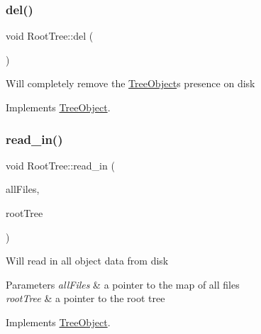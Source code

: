 \subsubsection{\texorpdfstring{del()}{del()}}
{\footnotesize\ttfamily void Root\+Tree\+::del (\begin{DoxyParamCaption}{ }\end{DoxyParamCaption})\hspace{0.3cm}{\ttfamily [virtual]}}

Will completely remove the \mbox{\hyperlink{classTreeObject}{Tree\+Object}}\textquotesingle{}s presence on disk 

Implements \mbox{\hyperlink{classTreeObject_af390b7479aa972888e594c07a85740b6}{Tree\+Object}}.

\mbox{\label{classRootTree_a658eed78be67e890de2283af960dc532}} 
\subsubsection{\texorpdfstring{read\+\_\+in()}{read\_in()}}
{\footnotesize\ttfamily void Root\+Tree\+::read\+\_\+in (\begin{DoxyParamCaption}\item[{unordered\+\_\+multimap$<$ string, \mbox{\hyperlink{classFileInfo}{File\+Info}} $\ast$$>$ $\ast$}]{all\+Files,  }\item[{\mbox{\hyperlink{classRootTree}{Root\+Tree}} $\ast$}]{root\+Tree }\end{DoxyParamCaption})\hspace{0.3cm}{\ttfamily [virtual]}}

Will read in all object data from disk 
\begin{DoxyParams}{Parameters}
{\em all\+Files} & a pointer to the map of all files \\
\hline
{\em root\+Tree} & a pointer to the root tree \\
\hline
\end{DoxyParams}


Implements \mbox{\hyperlink{classTreeObject_a722eb00e6782626281afc8eff92840a4}{Tree\+Object}}.

\mbox{\label{classRootTree_ad6eefe5d46ee37b3725799897a78c2dd}} 
